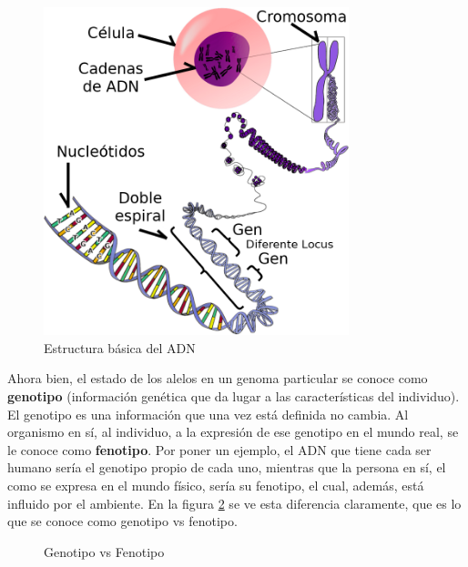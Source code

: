 \begin{figure}[h]
	\centering
	\includegraphics[width=0.79\textwidth]{Figures/basicDNAStructure}
	\caption{Estructura básica del ADN}
	\label{fig:basicDNAStructure}
\end{figure}

Ahora bien, el estado de los alelos en un genoma particular se conoce como \textbf{genotipo} (información genética que da lugar a las características del individuo). El genotipo es una información que una vez está definida no cambia. Al organismo en sí, al individuo, a la expresión de ese genotipo en el mundo real, se le conoce como \textbf{fenotipo}. Por poner un ejemplo, el ADN que tiene cada ser humano sería el genotipo propio de cada uno, mientras que la persona en sí, el como se expresa en el mundo físico, sería su fenotipo, el cual, además, está influido por el ambiente. En la figura \ref{fig:genotypeVSphenotype} se ve esta diferencia claramente, que es lo que se conoce como genotipo vs fenotipo.

\begin{figure}[h]
    \centering
    \caption{Genotipo vs Fenotipo}
	\label{fig:genotypeVSphenotype}
\end{figure}

